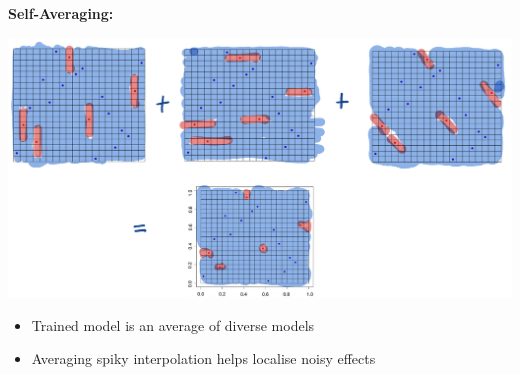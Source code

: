 \begin{itemize}
	\begin{minipage}{0.35\columnwidth}
	\textbf{Self-Averaging: }
	\begin{center}
		\includegraphics[width=\columnwidth]{images/9-adaboost-selfavg}
	\end{center}
	\end{minipage}
	\begin{minipage}{0.55\columnwidth}
		\begin{itemize}
			\item Trained model is an average of diverse models
			\item Averaging spiky interpolation helps localise noisy effects
		\end{itemize}
	\end{minipage}	
\end{itemize}

